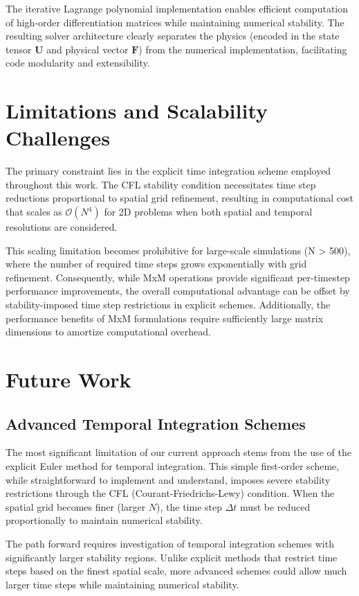 The iterative Lagrange polynomial implementation enables efficient computation of high-order differentiation matrices while maintaining numerical stability. The resulting solver architecture clearly separates the physics (encoded in the state tensor $\mathbf{U}$ and physical vector $\mathbf{F}$) from the numerical implementation, facilitating code modularity and extensibility.

\section{Limitations and Scalability Challenges}

The primary constraint lies in the explicit time integration scheme employed throughout this work. The CFL stability condition necessitates time step reductions proportional to spatial grid refinement, resulting in computational cost that scales as $\mathcal{O}(N^4)$ for 2D problems when both spatial and temporal resolutions are considered.

This scaling limitation becomes prohibitive for large-scale simulations (N > 500), where the number of required time steps grows exponentially with grid refinement. Consequently, while MxM operations provide significant per-timestep performance improvements, the overall computational advantage can be offset by stability-imposed time step restrictions in explicit schemes. Additionally, the performance benefits of MxM formulations require sufficiently large matrix dimensions to amortize computational overhead.

\section{Future Work}

\subsection*{Advanced Temporal Integration Schemes}

The most significant limitation of our current approach stems from the use of the explicit Euler method for temporal integration. This simple first-order scheme, while straightforward to implement and understand, imposes severe stability restrictions through the CFL (Courant-Friedrichs-Lewy) condition. When the spatial grid becomes finer (larger $N$), the time step $\Delta t$ must be reduced proportionally to maintain numerical stability.

The path forward requires investigation of temporal integration schemes with significantly larger stability regions. Unlike explicit methods that restrict time steps based on the finest spatial scale, more advanced schemes could allow much larger time steps while maintaining numerical stability.

